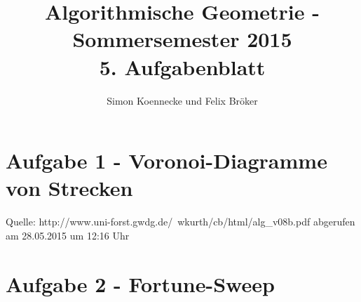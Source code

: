\documentclass[a4paper]{article}
\begin{document}
\title{Algorithmische Geometrie - Sommersemester 2015\\
       5. Aufgabenblatt }
\author{Simon Koennecke und Felix Bröker}
\date{}
\maketitle

\section*{Aufgabe 1 - Voronoi-Diagramme von Strecken}

\begin{figure} [!htb] 
\end{figure} 

Quelle: http://www.uni-forst.gwdg.de/~wkurth/cb/html/alg_v08b.pdf abgerufen am 28.05.2015 um 12:16 Uhr


\section*{Aufgabe 2 - Fortune-Sweep}
\end{document}

